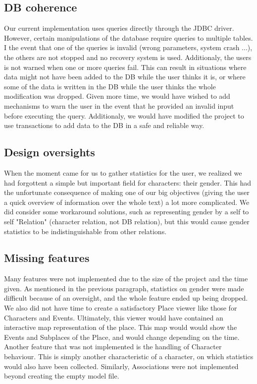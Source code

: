 \documentclass[a4paper ,12pt,french]{article}
\begin{document}
\subsection{DB coherence}
Our current implementation uses queries directly through the JDBC driver. However, certain manipulations of the database require queries to multiple tables. I the event that one of the queries is invalid (wrong parameters, system crash ...), the others are not stopped and no recovery system is used. Additionaly, the users is not warned when one or more queries fail. This can result in situations where data might not have been added to the DB while the user thinks it is, or where some of the data is written in the DB while the user thinks the whole modification was dropped.
Given more time, we would have wished to add mechanisms to warn the user in the event that he provided an invalid input before executing the query. Additionaly, we would have modified the project to use transactions to add data to the DB in a safe and reliable way.

\subsection{Design oversights}
When the moment came for us to gather statistics for the user, we realized we had forgottent a simple but important field for characters: their gender. This had the unfortunate consequence of making one of our big objectives (giving the user a quick overview of information over the whole text) a lot more complicated.
We did consider some workaround solutions, such as representing gender by a self to self "Relation" (character relation, not DB relation), but this would cause gender statistics to be indistinguishable from other relations.

\subsection{Missing features}
Many features were not implemented due to the size of the project and the time given. As mentioned in the previous paragraph, statistics on gender were made difficult because of an oversight, and the whole feature  ended up being dropped. We also did not have time to create a satisfactory Place viewer like those for Characters and Events. Ultimately, this viewer would have contained an interactive map representation of the place. This map would would show the Events and Subplaces of the Place, and would change depending on the time.
Another feature that was not implemented is the handling of Character behaviour. This is simply another characteristic of a character, on which statistics would also have been collected. Similarly, Associations were not implemented beyond creating the empty model file.
\end{document}
